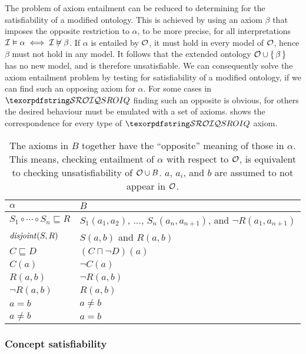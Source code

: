 The problem of axiom entailment can be reduced to determining for the satisfiability of a modified ontology. This is achieved by using an axiom $\beta$ that imposes the opposite restriction to $\alpha$, to be more precise, for all interpretations $\mathcal{I} \vDash \alpha \iff \mathcal{I} \not\vDash \beta$. If $\alpha$ is entailed by $\mathcal{O}$, it must hold in every model of $\mathcal{O}$, hence $\beta$ must not hold in any model. It follows that the extended ontology $\mathcal{O} \cup \{ \, \beta \, \}$ has no new model, and is therefore unsatisfiable. We can consequently solve the axiom entailment problem by testing for satisfiability of a modified ontology, if we can find such an opposing axiom for $\alpha$. For some cases in $\SROIQ$ finding such an opposite is obvious, for others the desired behaviour must be emulated with a set of axioms.  shows the correspondence for every type of $\SROIQ$ axiom.
\begin{table}
\begin{center}
\begin{tabular}{l|l}
    $\alpha$ & $B$ \\
    \hline
    $S_1 \circ \cdots \circ S_n \sqsubseteq R$ & $S_1(a_1, a_2)$, $\dots$, $S_n(a_n, a_{n + 1})$, and $\lnot R(a_1, a_{n + 1})$ \\
    $\mathit{disjoint}(S, R)$ & $S(a, b)$ and $R(a, b)$ \\
    $C \sqsubseteq D$ & $(C \sqcap \lnot D)(a)$ \\
    $C(a)$ & $\lnot C(a)$ \\
    $R(a, b)$ & $\lnot R(a, b)$ \\
    $\lnot R(a, b)$ & $R(a, b)$ \\
    $a = b$ & $a \not= b$ \\
    $a \not= b$ & $a = b$ \\
\end{tabular}
\end{center}
\label{tab:entailment-reduction}
\caption[Axioms substitution for reducing entailment to satisfiability]{The axioms in $B$ together have the “opposite” meaning of those in $\alpha$. This means, checking entailment of $\alpha$ with respect to $\mathcal{O}$, is equivalent to checking unsatisfiability of $\mathcal{O} \cup B$. $a$, $a_i$, and $b$ are assumed to not appear in $\mathcal{O}$.}
\end{table}

\subsubsection{Concept satisfiability} \label{concept-satisfiability}

